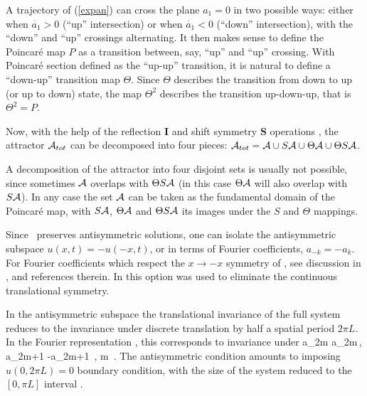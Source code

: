 A trajectory of
 (\ref{expan}) can cross the plane $a_1=0$ in two possible ways:
 either when
$\dot{a_1}>0$ (``up'' intersection)
or when  $\dot{a_1}<0$ (``down'' intersection),
 with the ``down'' and ``up'' crossings
alternating.
It then makes sense to define the  Poincar\'e map $P$ as a transition between,
say, ``up'' and ``up'' crossing.
With  Poincar\'e section defined as the ``up-up'' transition,
it is natural to define a ``down-up'' transition map $\Theta$. Since
$\Theta$ describes the transition from down to up (or up to down) state,
the map $\Theta^2$ describes the transition  up-down-up, that is
$\Theta^2=P$.

Now, with the help of the 
reflection $\mathbf{I}$ and shift symmetry $ \mathbf{S}$
operations
,
the  attractor ${\cal A}_{tot}$ can be
decomposed into four pieces:
 ${\cal A}_{tot}={\cal A} \cup S {\cal A}  \cup \Theta {\cal A}
  \cup \Theta S {\cal A} $. 

A decomposition
of the attractor into four disjoint sets
is usually not possible, since sometimes $ {\cal A}$ overlaps with
$\Theta S{\cal A} $ (in this case $\Theta  {\cal A}$ will also  overlap with
$S {\cal A} $).
In any case  the set $ {\cal A}$ can be taken as
the fundamental
domain of the Poincar{\'e} map, with $S  {\cal A} $,
$\Theta  {\cal A} $ and $\Theta S  {\cal A} $ its images under the
$S$ and $\Theta$ mappings.



Since \KSe\ preserves
antisymmetric solutions, one can isolate the antisymmetric
subspace 
$u(x,t)=-u(-x,t)$, or in terms of Fourier coefficients,
$a_{-k}= - a_k$. 
For Fourier coefficients which respect the $x \to -x$ symmetry of
\KSe, see discussion in ,
and references therein.
In  
this option was used to eliminate
the continuous translational symmetry.

In the antisymmetric subspace the translational 
invariance of the full system reduces
to the invariance under discrete
translation by half a spatial period $2\pi L$.
In the Fourier representation , 
this corresponds to invariance under 
\beq
a_{2m} \to a_{2m}\,, a_{2m+1} \to -a_{2m+1}
\,, m \in {}
\,.
The antisymmetric condition amounts to imposing
$u(0,2\pi L)=0$ boundary condition, with
the size of the system reduced to
the $[0, \pi L]$ interval .

